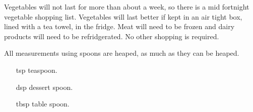 \documentclass{cookbook}
\begin{document}
Vegetables will not last for more than about a week,
so there is a mid fortnight vegetable shopping list.
Vegetables will last better if kept in an air tight box,
lined with a tea towel,
in the fridge.
Meat will need to be frozen
and
dairy products will need to be refridgerated.
No other shopping is required.

All measurements using spoons are heaped,
as much as they can be heaped.

\begin{itemize}
	\item[tsp] teaspoon.            %
	\item[dsp] dessert spoon.       %
	\item[tbsp] table spoon.        %
\end{itemize}

\end{document}
